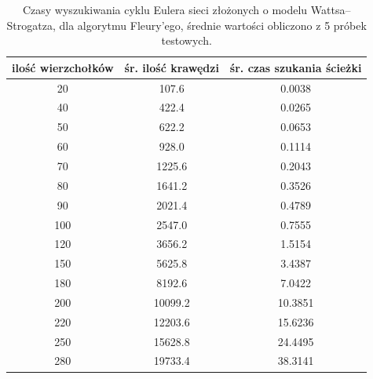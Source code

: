 \documentclass[a4paper, 12pt, twoside, openright]{article}
\begin{document}
\begin{table}[!p]
	\centering
	\caption{Czasy wyszukiwania cyklu Eulera sieci złożonych o modelu Wattsa–Strogatza, dla algorytmu Fleury'ego, średnie wartości obliczono z 5 próbek testowych.}
	
	\resizebox{16cm}{!}
	{
		\begin{tabular}{|c c c|}
			\hline
			ilość wierzchołków	& śr. ilość krawędzi 	& śr. czas szukania ścieżki	\\ \hline \hline
			20 	& 107.6 	 	& 0.0038	\\ \hline
			40 	& 422.4 		& 0.0265	\\ \hline
			50 	& 622.2 	 	& 0.0653	\\ \hline
			60 	& 928.0 		& 0.1114	\\ \hline
			70 	& 1225.6      	& 0.2043	\\ \hline
			80 	& 1641.2     	& 0.3526	\\ \hline
			90  & 2021.4    	& 0.4789	\\ \hline
			100 & 2547.0    	& 0.7555	\\ \hline
			120 & 3656.2    	& 1.5154	\\ \hline
			150 & 5625.8   		& 3.4387	\\ \hline
			180 & 8192.6     	& 7.0422	\\ \hline
			200 & 10099.2 		& 10.3851	\\ \hline
			220 & 12203.6 		& 15.6236	\\ \hline
			250 & 15628.8 		& 24.4495	\\ \hline
			280 & 19733.4 		& 38.3141	\\ \hline
		\end{tabular} 
	}
	\label{Tab:WS_Fleury}
\end{table}
\end{document}
